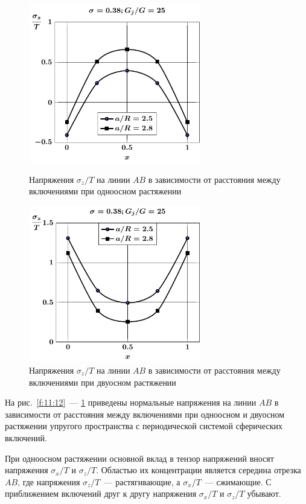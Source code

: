 \begin{figure}[h!]
\centering\footnotesize
\parbox[b]{7.5cm}{\centering\includegraphics[width=7.5cm]{periodic-spheres-inc27-a-g25-t1-sig_z.pdf}
\caption{Напряжения $\sigma_z/T$ на линии $AB$ в зависимости от расстояния между включениями при одноосном растяжении
\label{f:11:16}}}\hfil\hfil
\parbox[b]{7.5cm}{\centering\includegraphics[width=7.5cm]{periodic-spheres-inc27-a-g25-t2-sig_z.pdf}
\caption{Напряжения $\sigma_z/T$ на линии $AB$ в зависимости от расстояния между включениями при двуосном растяжении
\label{f:11:17}}}
\end{figure}

На рис.~\ref{f:11:12}~--- \ref{f:11:17} приведены нормальные напряжения на линии $AB$ в зависимости от расстояния между включениями при одноосном и двуосном растяжении упругого пространства с периодической системой сферических включений.

При одноосном растяжении основной вклад в тензор напряжений вносят напряжения $\sigma_x/T$ и $\sigma_z/T$. Областью их концентрации является середина отрезка $AB$, где напряжения $\sigma_z/T$~--- растягивающие, а $\sigma_x/T$~--- сжимающие. С приближением включений друг к другу напряжения $\sigma_x/T$ и $\sigma_z/T$ убывают.

